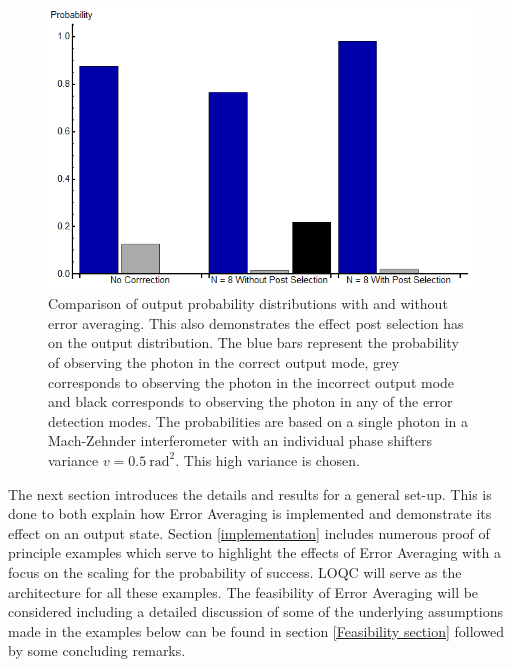 \documentclass[aps,pra,twocolumn,superscriptaddress,numerical]{revtex4-1}
\begin{document}
\begin{figure}
	\begin{centering}
		\includegraphics[width=\columnwidth]{prob_distributions.png}
	\end{centering}
	\caption[Comparison of output probability distributions with and without Error Averaging.]{Comparison of output probability distributions with and without error 	averaging. This also demonstrates the effect post selection has on the output distribution. The blue bars represent the probability of observing the photon in the correct output mode, grey corresponds to observing the photon in the incorrect output mode and black corresponds to observing the photon in any of the error detection modes. The probabilities are based on a single photon in a Mach-Zehnder interferometer with an individual phase shifters variance $v=0.5\ \textrm{rad}^{2}$. This high variance is chosen.} 
	\label{fig:output_probabilities}
\end{figure}

The next section introduces the details and results for a general set-up. This is done to both explain how Error Averaging is implemented and demonstrate its effect on an output state. Section \ref{implementation} includes numerous proof of principle examples which serve to highlight the effects of Error Averaging with a focus on the scaling for the probability of success. LOQC will serve as the architecture for all these examples. The feasibility of Error Averaging will be considered including a detailed discussion of some of the underlying assumptions made in the examples below can be found in section \ref{Feasibility section} followed by some concluding remarks.

\end{document}
